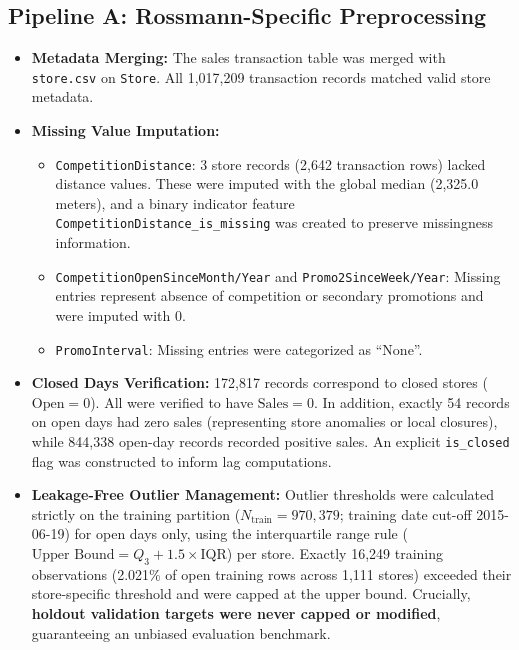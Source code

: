 \documentclass[11pt,a4paper]{article}
\begin{document}
\subsection{Pipeline A: Rossmann-Specific Preprocessing}
\begin{itemize}
    \item \textbf{Metadata Merging:} The sales transaction table was merged with \texttt{store.csv} on \texttt{Store}. All 1,017,209 transaction records matched valid store metadata.
    \item \textbf{Missing Value Imputation:}
    \begin{itemize}
        \item \texttt{CompetitionDistance}: 3 store records (2,642 transaction rows) lacked distance values. These were imputed with the global median (2,325.0 meters), and a binary indicator feature \texttt{CompetitionDistance\_is\_missing} was created to preserve missingness information.
        \item \texttt{CompetitionOpenSinceMonth/Year} and \texttt{Promo2SinceWeek/Year}: Missing entries represent absence of competition or secondary promotions and were imputed with 0.
        \item \texttt{PromoInterval}: Missing entries were categorized as ``None''.
    \end{itemize}
    \item \textbf{Closed Days Verification:} 172,817 records correspond to closed stores ($\text{Open} = 0$). All were verified to have $\text{Sales} = 0$. In addition, exactly 54 records on open days had zero sales (representing store anomalies or local closures), while 844,338 open-day records recorded positive sales. An explicit \texttt{is\_closed} flag was constructed to inform lag computations.
    \item \textbf{Leakage-Free Outlier Management:} Outlier thresholds were calculated strictly on the training partition ($N_{\text{train}} = 970,379$; training date cut-off 2015-06-19) for open days only, using the interquartile range rule ($\text{Upper Bound} = Q_3 + 1.5 \times \text{IQR}$) per store. Exactly 16,249 training observations (2.021\% of open training rows across 1,111 stores) exceeded their store-specific threshold and were capped at the upper bound. Crucially, \textbf{holdout validation targets were never capped or modified}, guaranteeing an unbiased evaluation benchmark.
\end{itemize}
\end{document}
